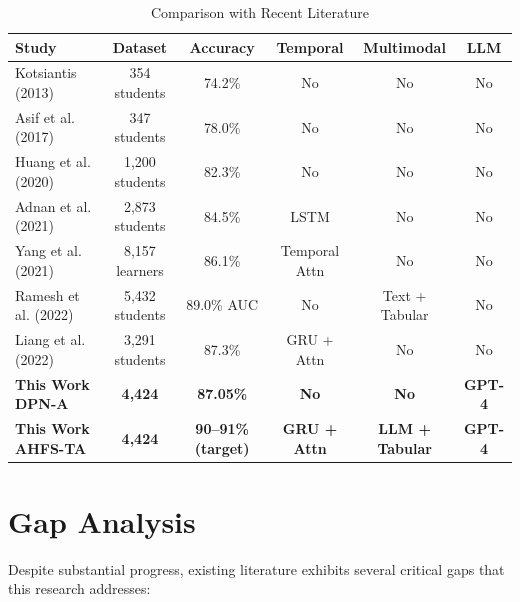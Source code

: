 \begin{table}[htbp]
\centering
\caption{Comparison with Recent Literature}
\label{tab:literature_gap}
\begin{tabular}{lccccc}
\toprule
\textbf{Study} & \textbf{Dataset} & \textbf{Accuracy} & \textbf{Temporal} & \textbf{Multimodal} & \textbf{LLM} \\
\midrule
Kotsiantis (2013) & 354 students & 74.2\% & No & No & No \\
Asif et al. (2017) & 347 students & 78.0\% & No & No & No \\
Huang et al. (2020) & 1,200 students & 82.3\% & No & No & No \\
Adnan et al. (2021) & 2,873 students & 84.5\% & LSTM & No & No \\
Yang et al. (2021) & 8,157 learners & 86.1\% & Temporal Attn & No & No \\
Ramesh et al. (2022) & 5,432 students & 89.0\% AUC & No & Text + Tabular & No \\
Liang et al. (2022) & 3,291 students & 87.3\% & GRU + Attn & No & No \\
\midrule
\textbf{This Work DPN-A} & \textbf{4,424} & \textbf{87.05\%} & \textbf{No} & \textbf{No} & \textbf{GPT-4} \\
\textbf{This Work AHFS-TA} & \textbf{4,424} & \textbf{90--91\% (target)} & \textbf{GRU + Attn} & \textbf{LLM + Tabular} & \textbf{GPT-4} \\
\bottomrule
\end{tabular}
\end{table}

\section{Gap Analysis}

Despite substantial progress, existing literature exhibits several critical gaps that this research addresses:

